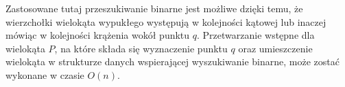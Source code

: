 \begin{figure}[htp]
  \caption{\label{fig:binstruct}}
\end{figure}

Zastosowane tutaj przeszukiwanie binarne jest możliwe dzięki temu, że
wierzchołki wielokąta wypukłego występują w kolejności kątowej lub
inaczej mówiąc w kolejności krążenia wokół punktu $q$. Przetwarzanie
wstępne dla wielokąta $P$, na które składa się wyznaczenie punktu $q$
oraz umieszczenie wielokąta w strukturze danych wspierającej
wyszukiwanie binarne, może zostać wykonane w czasie $O(n)$.


